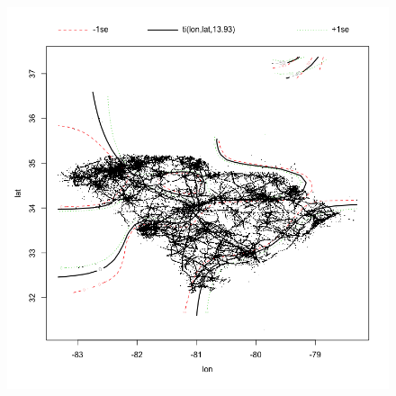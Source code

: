 \documentclass{beamer}
\begin{document}
\begin{frame}
\begin{figure}
\includegraphics[scale=.2]{figures/lonlat}
\end{figure}

\end{frame}
\end{document}
